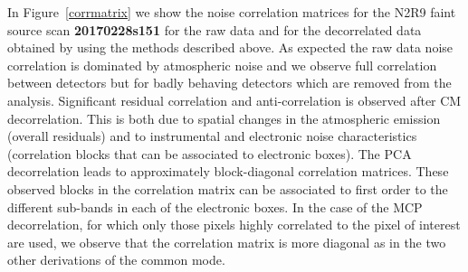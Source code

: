 In Figure~\ref{corrmatrix} we show the noise correlation matrices for the N2R9
faint source scan {\bf 20170228s151} for the raw data and for the decorrelated
data obtained by using the methods described above. As expected the raw data
noise correlation is dominated by atmospheric noise and we observe full
correlation between detectors but for badly behaving detectors which are removed
from the analysis. Significant residual correlation and anti-correlation is
observed after CM decorrelation. This is both due to spatial changes in the
atmospheric emission (overall residuals) and to instrumental and electronic
noise characteristics (correlation blocks that can be associated to electronic
boxes).  The PCA decorrelation leads to approximately block-diagonal correlation
matrices. These observed blocks in the correlation matrix can be associated to
first order to the different sub-bands in each of the electronic boxes. In the
case of the MCP decorrelation, for which only those pixels highly correlated to
the pixel of interest are used, we observe that the correlation matrix is more
diagonal as in the two other derivations of the common mode.


